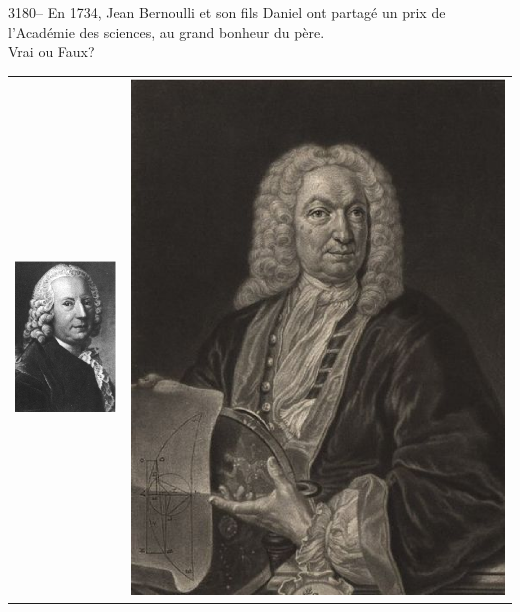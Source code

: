\documentclass[letterpaper, 12pt]{article}
\begin{document}
3180-- En 1734, Jean Bernoulli et son fils Daniel ont partag\'e un prix de l'Acad\'emie des sciences, au grand bonheur du p\`ere.\\
Vrai ou Faux?\\
\begin{center}
\begin{tabular}{c  c}
\includegraphics[scale=0.75]{Daniel_Bernoulli.eps} & \includegraphics[scale=0.15]{Jean_Bernoulli.eps}\\

\end{tabular}
\end{center}
\end{document}
